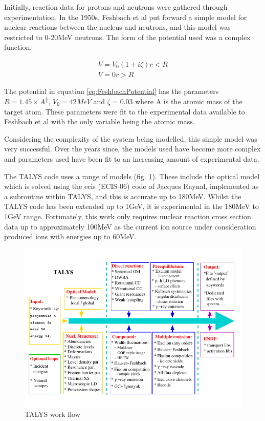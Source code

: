 Initially, reaction data for protons and neutrons were gathered through experimentation.  In the 1950s, Feshbach et al put forward a simple model for nuclear reactions between the nucleus and neutrons, and this model was restricted to 0-20MeV neutrons.  The form of the potential used was a complex function\cite{hodgson1}.

\begin{equation}
\begin{split}
V = V_0 (1 + i \zeta) r < R \\
V = 0 r > R
\end{split}
\label{eq:FeshbachPotential}
\end{equation}

The potential in equation \ref{eq:FeshbachPotential} has the parameters $R = 1.45 \times A^{\frac{1}{3}}$, $V_0 = 42MeV$ and $\zeta = 0.03$ where A is the atomic mass of the target atom.  These parameters were fit to the experimental data available to Feshbach et al\cite{feshbach} with the only variable being the atomic mass\cite{hodgson1}.

Considering the complexity of the system being modelled, this simple model was very successful.  Over the years since, the models used have become more complex and parameters used have been fit to an increasing amount of experimental data.

The TALYS code uses a range of models (fig. \ref{fig:talysworkflow}).  These include the optical model which is solved using the \acrlong{ecis} (ECIS-06) code of Jacques Raynal, implemented as a subroutine within TALYS, and this is accurate up to 180MeV\cite{talysmanual}.  Whilst the TALYS code has been extended up to 1GeV, it is experimental in the 180MeV to 1GeV range.  Fortunately, this work only requires nuclear reaction cross section data up to approximately 100MeV as the current ion source under consideration produced ions with energies up to 60MeV.

\begin{figure}[tbp]
  \begin{center}
    \includegraphics[width=.6\linewidth]{chapters/isotope_activation_and_radioactive_decay/images/talys.png}
    \caption{TALYS work flow \cite{talysmanual}}
    \label{fig:talysworkflow}
  \end{center}
\end{figure}

